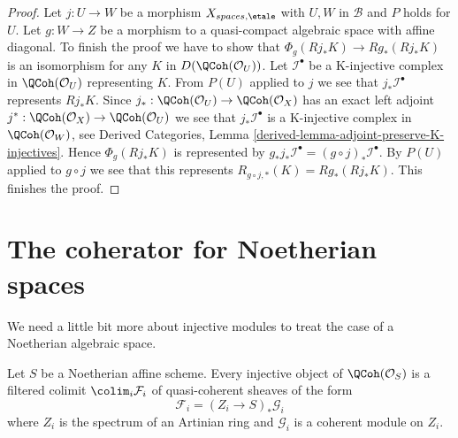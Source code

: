 \begin{proof}
\medskip\noindent
Let $j : U \to W$ be a morphism $X_{spaces, \etale}$ with
$U, W$ in $\mathcal{B}$ and $P$ holds for $U$. Let $g : W \to Z$
be a morphism to a quasi-compact algebraic space with affine diagonal.
To finish the proof we have to show that
$\Phi_g(Rj_*K) \to Rg_*(Rj_*K)$
is an isomorphism for any $K$ in $D(\QCoh(\mathcal{O}_U))$.
Let $\mathcal{I}^\bullet$ be a K-injective complex in $\QCoh(\mathcal{O}_U)$
representing $K$.
From $P(U)$ applied to $j$ we see that
$j_*\mathcal{I}^\bullet$ represents $Rj_*K$.
Since $j_* : \QCoh(\mathcal{O}_U) \to \QCoh(\mathcal{O}_X)$
has an exact left adjoint
$j^* : \QCoh(\mathcal{O}_X) \to \QCoh(\mathcal{O}_U)$
we see that $j_*\mathcal{I}^\bullet$ is a K-injective complex
in $\QCoh(\mathcal{O}_W)$, see
Derived Categories, Lemma \ref{derived-lemma-adjoint-preserve-K-injectives}.
Hence $\Phi_g(Rj_*K)$ is represented by
$g_*j_*\mathcal{I}^\bullet = (g \circ j)_*\mathcal{I}^\bullet$.
By $P(U)$ applied to $g \circ j$ we see that this represents
$R_{g \circ j, *}(K) = Rg_*(Rj_*K)$. This finishes the proof.
\end{proof}









\section{The coherator for Noetherian spaces}
\label{section-coherator-Noetherian}

\noindent
We need a little bit more about injective modules to treat the case
of a Noetherian algebraic space.

\begin{lemma}
\label{lemma-affine-injective-colimit-direct-sum-pushforwards-artin}
Let $S$ be a Noetherian affine scheme. Every injective object of
$\QCoh(\mathcal{O}_S)$ is a filtered colimit $\colim_i \mathcal{F}_i$
of quasi-coherent sheaves of the form
$$
\mathcal{F}_i = (Z_i \to S)_*\mathcal{G}_i
$$
where $Z_i$ is the spectrum of an Artinian ring and $\mathcal{G}_i$
is a coherent module on $Z_i$.
\end{lemma}

